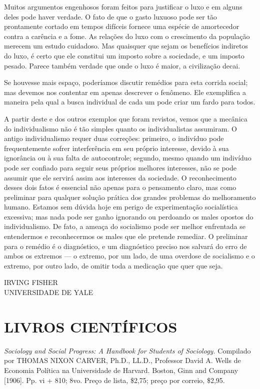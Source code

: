 \documentclass[12pt]{article}
\begin{document}
Muitos argumentos engenhosos foram feitos para justificar o luxo e em alguns deles pode haver verdade. O fato de que o gasto luxuoso pode ser tão prontamente cortado em tempos difíceis fornece uma espécie de amortecedor contra a carência e a fome. As relações do luxo com o crescimento da população merecem um estudo cuidadoso. Mas quaisquer que sejam os benefícios indiretos do luxo, é certo que ele constitui um imposto sobre a sociedade, e um imposto pesado. Parece também verdade que onde o luxo é maior, a civilização decai.

Se houvesse mais espaço, poderíamos discutir remédios para esta corrida social; mas devemos nos contentar em apenas descrever o fenômeno. Ele exemplifica a maneira pela qual a busca individual de cada um pode criar um fardo para todos.

A partir deste e dos outros exemplos que foram revistos, vemos que a mecânica do individualismo não é tão simples quanto os individualistas assumiram. O antigo individualismo requer duas correções: primeiro, o indivíduo pode frequentemente sofrer interferência em seu próprio interesse, devido à sua ignorância ou à sua falta de autocontrole; segundo, mesmo quando um indivíduo pode ser confiado para seguir seus próprios melhores interesses, não se pode assumir que ele servirá assim aos interesses da sociedade. O reconhecimento desses dois fatos é essencial não apenas para o pensamento claro, mas como preliminar para qualquer solução prática dos grandes problemas do melhoramento humano. Estamos sem dúvida hoje em perigo de experimentação socialística excessiva; mas nada pode ser ganho ignorando ou perdoando os males opostos do individualismo. De fato, a ameaça do socialismo pode ser melhor enfrentada se entendermos e reconhecermos os males que ele pretende remediar. O preliminar para o remédio é o diagnóstico, e um diagnóstico preciso nos salvará do erro de ambos os extremos — o extremo, por um lado, de uma overdose de socialismo e o extremo, por outro lado, de omitir toda a medicação que quer que seja.

\bigskip
\begin{flushright}
IRVING FISHER \\
UNIVERSIDADE DE YALE
\end{flushright}

\section*{LIVROS CIENTÍFICOS}

\textit{Sociology and Social Progress: A Handbook for Students of Sociology.} Compilado por THOMAS NIXON CARVER, Ph.D., LL.D., Professor David A. Wells de Economia Política na Universidade de Harvard. Boston, Ginn and Company [1906]. Pp. vi + 810; 8vo. Preço de lista, \$2,75; preço por correio, \$2,95.
\end{document}
